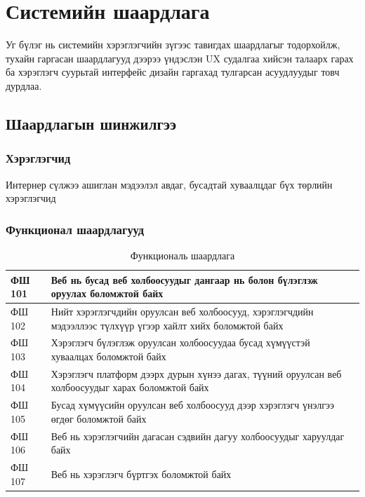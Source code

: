\chapter{Системийн шаардлага}

Уг бүлэг нь системийн хэрэглэгчийн зүгээс тавигдах шаардлагыг тодорхойлж, тухайн гаргасан шаардлагууд дээрээ үндэслэн UX судалгаа хийсэн талаарх гарах ба хэрэглэгч суурьтай интерфейс дизайн гаргахад тулгарсан асуудлуудыг товч дурдлаа.

\section{Шаардлагын шинжилгээ}

\subsection{Хэрэглэгчид}

Интернер сүлжээ ашиглан мэдээлэл авдаг, бусадтай хуваалцдаг бүх төрлийн хэрэглэгчид

\subsection{Функционал шаардлагууд}

\begin{table}[h]
	\centering
	\caption{Функциональ шаардлага}
	\begin{tabular}{ |p{2cm}|p{13cm}| }
	\hline
	ФШ 101 &  Веб нь бусад веб холбоосуудыг дангаар нь болон бүлэглэж оруулах боломжтой байх \\ \hline
	ФШ 102 &  Нийт хэрэглэгчдийн оруулсан веб холбоосууд, хэрэглэгчдийн мэдээллээс түлхүүр үгээр хайлт хийх боломжтой байх \\ \hline
	ФШ 103 &  Хэрэглэгч бүлэглэж оруулсан холбоосуудаа бусад хүмүүстэй хуваалцах боломжтой байх \\ \hline
	ФШ 104 &  Хэрэглэгч платформ дээрх дурын хүнээ дагах, түүний оруулсан веб холбоосуудыг харах боломжтой байх \\ \hline
	ФШ 105 &  Бусад хүмүүсийн оруулсан веб холбоосууд дээр хэрэглэгч үнэлгээ өгдөг боломжтой байх \\ \hline
	ФШ 106 &  Веб нь хэрэглэгчийн дагасан сэдвийн дагуу холбоосуудыг харуулдаг байх \\  \hline
	ФШ 107 &  Веб нь хэрэглэгч бүртгэх боломжтой байх \\ \hline
\end{tabular}
\end{table}

